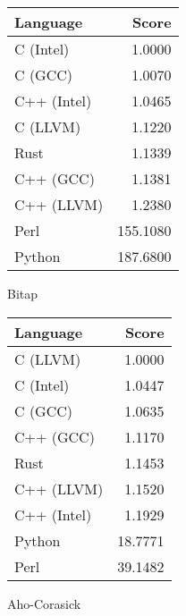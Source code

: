 \begin{subtable}{0.33\textwidth}
    \centering
    \begin{tabular}{|l|r|}
        \hline
        Language & Score \\
        \hline
        C (Intel) & 1.0000 \\
        C (GCC) & 1.0070 \\
        C++ (Intel) & 1.0465 \\
        C (LLVM) & 1.1220 \\
        Rust & 1.1339 \\
        C++ (GCC) & 1.1381 \\
        C++ (LLVM) & 1.2380 \\
        Perl & 155.1080 \\
        Python & 187.6800 \\
        \hline
    \end{tabular}
    \caption{Bitap}
    \label{table:runtime:shift_or}
\end{subtable}
\begin{subtable}{0.33\textwidth}
    \centering
    \begin{tabular}{|l|r|}
        \hline
        Language & Score \\
        \hline
        C (LLVM) & 1.0000 \\
        C (Intel) & 1.0447 \\
        C (GCC) & 1.0635 \\
        C++ (GCC) & 1.1170 \\
        Rust & 1.1453 \\
        C++ (LLVM) & 1.1520 \\
        C++ (Intel) & 1.1929 \\
        Python & 18.7771 \\
        Perl & 39.1482 \\
        \hline
    \end{tabular}
    \caption{Aho-Corasick}
    \label{table:runtime:aho_corasick}
\end{subtable}%
